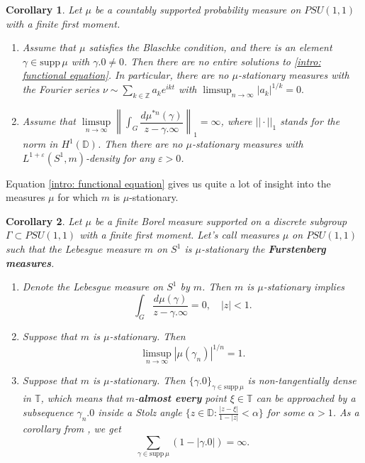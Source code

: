 \documentclass[11pt]{article}
\newtheorem{corollary}{Corollary}[section]
\begin{document}
\begin{corollary}
	\label{C:main corollary}
	Let $\mu$ be a countably supported probability measure on $PSU(1,1)$ with a finite first moment.
	\begin{enumerate}
		\item Assume that $\mu$ satisfies the Blaschke condition, and there is an element $\gamma \in \text{supp} \, \mu$ with $\gamma.0 \ne 0$. Then there are no entire solutions to \eqref{intro: functional equation}. In particular, there are no $\mu$-stationary measures with the Fourier series $\nu \sim \sum_{k \in \mathbb{Z}} a_k e^{i k t}$ with $\limsup_{n \rightarrow \infty} |a_k|^{1/k} = 0.$
		\item Assume that $\limsup\limits_{n \rightarrow \infty} \left\| \int_G \dfrac{d \mu^{*n}(\gamma)}{z - \gamma.\infty} \right\|_1 = \infty$, where $||\cdot||_1$ stands for the norm in $H^1(\mathbb{D})$. Then there are no $\mu$-stationary measures with $L^{1+\varepsilon}(S^1, m)$-density for any $\varepsilon > 0$.
	\end{enumerate}
\end{corollary}

Equation \eqref{intro: functional equation} gives us quite a lot of insight into the measures $\mu$ for which $m$ is $\mu$-stationary.

\begin{corollary}
	\label{intro: Lebesgue is stationary}
	Let $\mu$ be a finite Borel measure supported on a discrete subgroup $\Gamma \subset PSU(1,1)$ with a finite first moment. Let's call measures $\mu$ on $PSU(1,1)$ such that the Lebesgue measure $m$ on $S^1$ is $\mu$-stationary the \textbf{Furstenberg measures}.
	\begin{enumerate}
		\item Denote the Lebesgue measure on $S^1$ by $m$. Then $m$ is $\mu$-stationary implies
		\begin{equation}
			\int_G \frac{d \mu(\gamma)}{z - \gamma.\infty} = 0, \quad |z| < 1.
		\end{equation}
		\item Suppose that $m$ is $\mu$-stationary. Then
		\[
		\limsup_{n \rightarrow \infty} |\mu(\gamma_n)|^{1/n} = 1.
		\]
		\item Suppose that $m$ is $\mu$-stationary. Then $\{\gamma.0\}_{\gamma \in \text{supp} \, \mu}$ is non-tangentially dense in $\mathbb{T}$, which means that $m$-\textbf{almost every} point $\xi \in \mathbb{T}$ can be approached by a subsequence $\gamma_n.0$ inside a Stolz angle $\{ z \in \mathbb{D} : \frac{|z - \xi|}{1 - |z|} < \alpha \}$ for some $\alpha > 1$. As a corollary from \cite[Remark 2]{brownsums}, we get
		\[
		\sum_{\gamma \in \text{supp}\, \mu} (1 - |\gamma.0|) = \infty.
		\]
	\end{enumerate}
\end{corollary}
\end{document}
